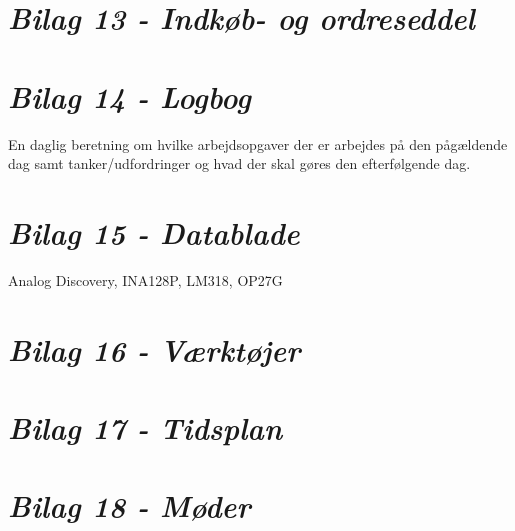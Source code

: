 \section*{\textit{Bilag 13 - Indkøb- og ordreseddel}} \label{bilag13}
\section*{\textit{Bilag 14 - Logbog}} \label{bilag14}
En daglig beretning om hvilke arbejdsopgaver der er arbejdes på den pågældende dag samt tanker/udfordringer og hvad der skal gøres den efterfølgende dag.
\section*{\textit{Bilag 15 - Datablade}} \label{bilag15}
Analog Discovery, INA128P, LM318, OP27G
\section*{\textit{Bilag 16 - Værktøjer}} \label{bilag16}
\section*{\textit{Bilag 17 - Tidsplan}} \label{bilag17}
\section*{\textit{Bilag 18 - Møder}} \label{bilag18}






